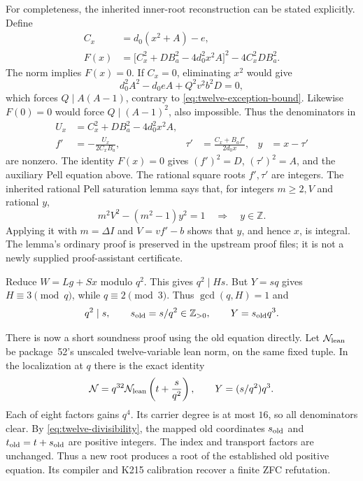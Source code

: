 For completeness, the inherited inner-root reconstruction can be stated
explicitly. Define
\begin{align*}
 C_x&=d_0(x^2+A)-e,\\
 F(x)&=\bigl[C_x^2+DB_a^2-4d_0^2x^2A\bigr]^2-4C_x^2DB_a^2.
\end{align*}
The norm implies $F(x)=0$. If $C_x=0$, eliminating $x^2$ would give
\[
 d_0^2A^2-d_0eA+Q^2v^2b^2D=0,
\]
which forces $Q\mid A(A-1)$, contrary to
\eqref{eq:twelve-exception-bound}. Likewise $F(0)=0$ would force
$Q\mid(A-1)^2$, also impossible. Thus the denominators in
\begin{align*}
 U_x&=C_x^2+DB_a^2-4d_0^2x^2A,\\
 f'&=-\frac{U_x}{2C_xB_a},&
 \tau'&=\frac{C_x+B_af'}{2d_0x},&y&=x-\tau'
\end{align*}
are nonzero. The identity $F(x)=0$ gives
$(f')^2=D$, $(\tau')^2=A$, and the auxiliary Pell equation above.
The rational square roots $f',\tau'$ are integers. The inherited rational
Pell saturation lemma says that, for integers $m\ge2,V$ and rational $y$,
\[
 m^2V^2-(m^2-1)y^2=1\quad\Longrightarrow\quad y\in\mathbb Z.
\]
Applying it with $m=\Delta I$ and $V=vf'-b$ shows that $y$, and hence $x$,
is integral. The lemma's ordinary proof is preserved in the upstream proof
files; it is not a newly supplied proof-assistant certificate.

Reduce $W=Lg+Sx$ modulo $q^2$. This gives $q^2\mid Hs$.
But $Y=sq$ gives $H\equiv3\pmod q$, while $q\equiv2\pmod3$.
Thus $\gcd(q,H)=1$ and
\begin{equation}
 q^2\mid s,
 \qquad s_{\rm old}=s/q^2\in\mathbb Z_{>0},
 \qquad Y=s_{\rm old}q^3.
 \label{eq:twelve-divisibility}
\end{equation}

There is now a short soundness proof using the old equation directly.
Let $\mathcal N_{\rm lean}$ be package~52's unscaled twelve-variable lean norm,
on the same fixed tuple. In the localization at $q$ there is the exact identity
\begin{equation}
 \mathcal N=q^{32}
   \mathcal N_{\rm lean}\left(t+\frac{s}{q^2}\right),
 \qquad Y=(s/q^2)q^3.
 \label{eq:twelve-identity}
\end{equation}
Each of eight factors gains $q^4$. Its carrier degree is at most $16$, so
all denominators clear. By \eqref{eq:twelve-divisibility}, the mapped old
coordinates $s_{\rm old}$ and $t_{\rm old}=t+s_{\rm old}$ are positive
integers. The index and transport factors are unchanged. Thus a new root
produces a root of the established old positive equation. Its compiler and
K215 calibration recover a finite ZFC refutation.

